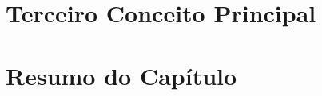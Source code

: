 \section{Terceiro Conceito Principal}
\label{rt-conceito3}




\section{Resumo do Capítulo}
\label{rt-resumo}
